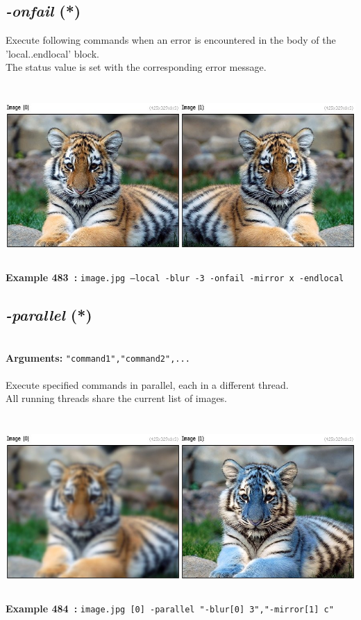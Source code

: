 \documentclass[a4paper,11pt,twoside]{book}
\begin{document}
\subsection{\emph{-onfail} (*)}\vspace*{-0.5em}
Execute following commands when an error is encountered in the body of the 'local..endlocal' block.
~\\The status value is set with the corresponding error message.
\begin{center}\includegraphics[keepaspectratio=true,height=7cm,width=\textwidth]{img/gmic_def483.jpg}\\
{\footnotesize \textbf{Example 483~:} \texttt{image.jpg --local -blur -3 -onfail -mirror x -endlocal}}
\end{center}

\subsection{\emph{-parallel} (*)}\vspace*{-0.5em}
~\\\textbf{Arguments: } 
{\small \texttt{"command1","command2",...}}\\~\\
Execute specified commands in parallel, each in a different thread.
~\\All running threads share the current list of images.
\begin{center}\includegraphics[keepaspectratio=true,height=7cm,width=\textwidth]{img/gmic_def484.jpg}\\
{\footnotesize \textbf{Example 484~:} \texttt{image.jpg [0] -parallel "-blur[0] 3","-mirror[1] c"}}
\end{center}
\end{document}
